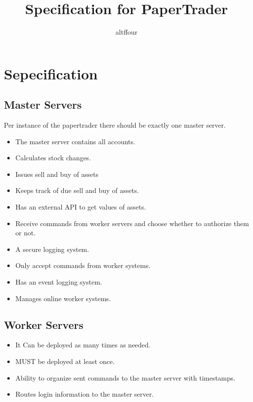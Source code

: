 \documentclass[a4paper]{article}
\title{Specification for PaperTrader}
\author{altffour}
\begin{document}
\maketitle
\newpage

\section{Sepecification}

\subsection{Master Servers}
Per instance of the papertrader there should be exactly one master server.

\begin{itemize}
	\item The master server contains all accounts.
	\item Calculates stock changes.
	\item Issues sell and buy of assets
	\item Keeps track of due sell and buy of assets.
	\item Has an external API to get values of assets.
	\item Receive commands from worker servers and choose whether to authorize them or not.
	\item A secure logging system.
	\item Only accept commands from worker systems.
	\item Has an event logging system.
	\item Manages online worker systems.
\end{itemize}

\subsection{Worker Servers}

\begin{itemize}
	\item It Can be deployed as many times as needed.
	\item MUST be deployed at least once.
	\item Ability to organize sent commands to the master server with timestamps.
	\item Routes login information to the master server.
\end{itemize}
\end{document}
